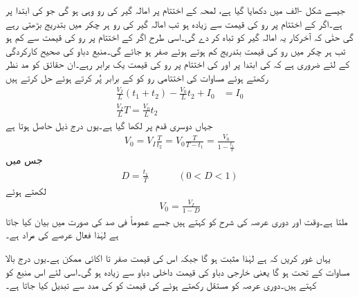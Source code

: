 جیسے شکل -الف میں دکھایا گیا ہے، لمحہ  کے اختتام پر امالہ گیر کی رو وہی ہو گی جو  کی ابتدا پر ہے۔اگر  کے اختتام پر رو کی قیمت  سے زیادہ ہو تب امالہ گیر کی رو ہر چکر میں بتدریج بڑھتی رہے گی حتٰی کہ آخرکار یہ امالہ گیر کو تباہ کر دے گی۔اسی طرح اگر  کے اختتام پر رو کی قیمت  سے کم ہو تب ہر چکر میں رو کی قیمت بتدریج کم ہوتے ہوئے صفر ہو جائے گی۔منبع دباو کی صحیح کارکردگی کے لئے ضروری ہے کہ  کی ابتدا پر اور  کی اختتام پر رو کی قیمت یک برابر رہے۔ان حقائق کو مد نظر رکھتے ہوئے مساوات  کی اختتامی رو کو  کے برابر پُر کرتے ہوئے حل کرتے ہیں
\begin{align*}
\frac{V_I}{L}(t_1+t_2)-\frac{V_0}{L}t_2+I_0 &=I_0\\
\frac{V_I}{L}T=\frac{V_0}{L}t_2
\end{align*}
جہاں دوسری قدم پر  لکھا گیا ہے۔یوں درج ذیل حاصل ہوتا ہے
\begin{align*}
V_0=V_I \frac{T}{t_2}=V_0 \frac{T}{T-t_1}=\frac{V_0}{1-\frac{t_1}{T}}
\end{align*}
جس میں
\begin{align}
D=\frac{t_1}{T}\quad \quad \quad (0< D < 1)
\end{align}
لکھتے ہوئے
\begin{align}
V_0=\frac{V_I}{1-D}
\end{align}
ملتا ہے۔وقت  اور دوری عرصہ  کی شرح  کو  کہتے ہیں جسے عموماً فی صد کی صورت میں بیان کیا جاتا ہے لہٰذا  فعال عرصے کی مراد  ہے۔

یہاں غور کریں کہ  ہے لہٰذا   مثبت ہو گا جبکہ اس کی قیمت صفر تا اکائی  ممکن ہے۔یوں درج بالا مساوات کے تحت  ہو گا یعنی خارجی دباو کی قیمت داخلی دباو سے زیادہ ہو گی۔اسی لئے اس منبع کو  کہتے ہیں۔دوری عرصہ  کو مستقل رکھتے ہوئے  کی قیمت کو  کی مدد سے تبدیل کیا جاتا ہے۔


